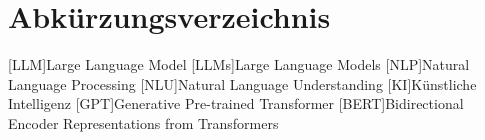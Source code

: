 \documentclass[a4paper, 12pt]{article}
\newcounter{lastromanpage}
\begin{document}

\newpage
{}
\tableofcontents
\newpage
\section*{Abkürzungsverzeichnis}
\begin{acronym}[BERT]
    [LLM]{Large Language Model}
    [LLMs]{Large Language Models}
    [NLP]{Natural Language Processing}
    [NLU]{Natural Language Understanding}
    [KI]{Künstliche Intelligenz}
    [GPT]{Generative Pre-trained Transformer}
    [BERT]{Bidirectional Encoder Representations from Transformers}
\end{acronym}
\newpage
\setcounter{lastromanpage}{\value{page}} %











\newpage
{}
\setcounter{page}{\value{lastromanpage}} %

\newpage
{} %
\printbibliography[title={Literaturverzeichnis}, heading=bibintoc]
\end{document}
